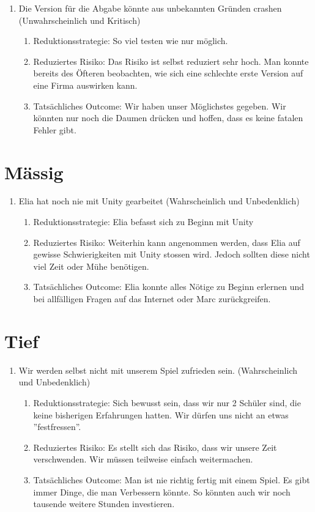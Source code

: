 \begin{enumerate}
    \item Die Version für die Abgabe könnte aus unbekannten Gründen crashen (Unwahrscheinlich und Kritisch)
    \begin{enumerate}
        \item Reduktionsstrategie: So viel testen wie nur möglich.
        \item Reduziertes Risiko: Das Risiko ist selbst reduziert sehr hoch. Man konnte bereits des Öfteren beobachten, wie sich eine schlechte erste Version auf eine Firma auswirken kann.
        \item Tatsächliches Outcome: Wir haben unser Möglichstes gegeben. Wir könnten nur noch die Daumen drücken und hoffen, dass es keine fatalen Fehler gibt.
    \end{enumerate}

\end{enumerate}

\section{Mässig}
\begin{enumerate}
    \item Elia hat noch nie mit Unity gearbeitet (Wahrscheinlich und Unbedenklich)
    \begin{enumerate}
        \item Reduktionsstrategie: Elia befasst sich zu Beginn mit Unity
        \item Reduziertes Risiko: Weiterhin kann angenommen werden, dass Elia auf gewisse Schwierigkeiten mit Unity stossen wird.
              Jedoch sollten diese nicht viel Zeit oder Mühe benötigen. 
        \item Tatsächliches Outcome: Elia konnte alles Nötige zu Beginn erlernen und bei allfälligen Fragen auf das Internet oder Marc zurückgreifen.
    \end{enumerate}
\end{enumerate}

\section{Tief}
\begin{enumerate}
    \item Wir werden selbst nicht mit unserem Spiel zufrieden sein. (Wahrscheinlich und Unbedenklich)
    \begin{enumerate}
        \item Reduktionsstrategie: Sich bewusst sein, dass wir nur 2 Schüler sind, die keine bisherigen Erfahrungen hatten. Wir dürfen uns nicht an etwas ''festfressen''.
        \item Reduziertes Risiko: Es stellt sich das Risiko, dass wir unsere Zeit verschwenden. Wir müssen teilweise einfach weitermachen.
        \item Tatsächliches Outcome: Man ist nie richtig fertig mit einem Spiel. Es gibt immer Dinge, die man Verbessern könnte. So könnten auch wir noch tausende weitere Stunden investieren.
    \end{enumerate}
\end{enumerate}